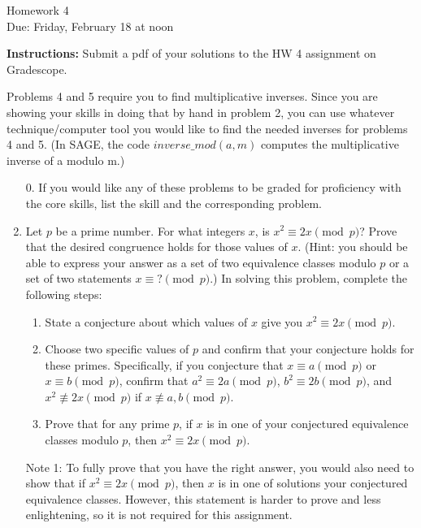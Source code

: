 \documentclass[12pt]{article}
\begin{document}
\begin{center}
{\Large Homework 4}\\
Due: Friday,  February 18 at noon\\


\end{center}
{\bf Instructions:} Submit a pdf of your solutions to the HW 4 assignment on Gradescope. 


 Problems 4 and 5 require you to find multiplicative inverses. Since you are showing your skills in doing that by hand in problem 2, you can use whatever technique/computer tool you would like to find the needed inverses for problems 4 and 5.  (In SAGE, the code $inverse\_mod(a,m)$ computes the multiplicative inverse of a modulo m.)

\begin{enumerate}
\item[0.] If you would like any of these problems to be graded for proficiency with the core skills, list the skill and the corresponding problem. 
\item Let $p$ be a prime number.  For what integers $x$, is $x^2\equiv 2x\pmod{p}$? Prove that the desired congruence holds for those values of $x$.  (Hint: you should be able to express your answer as a set of two equivalence classes modulo $p$ or a set of two statements $x\equiv ?\pmod{p}$.) In solving this problem, complete the following steps:
\begin{enumerate}
\item State a conjecture about which values of $x$ give you $x^2\equiv 2x\pmod{p}$.
\item Choose two specific values of $p$ and confirm that your conjecture holds for these primes.  Specifically, if you conjecture that $x\equiv a\pmod{p}$ or $x\equiv b\pmod{p}$, confirm that $a^2\equiv 2a\pmod{p}$, $b^2\equiv2b\pmod{p}$, and $x^2\not\equiv 2x\pmod{p}$ if $x\not\equiv a,b\pmod{p}$. 
\item Prove that for any prime $p$, if $x$ is in one of your conjectured equivalence classes modulo $p$, then $x^2\equiv 2x\pmod{p}$. 
\end{enumerate}

Note 1: To fully prove that you have the right answer, you would also need to show that if $x^2\equiv 2x\pmod{p}$, then $x$ is in one of  solutions your conjectured equivalence classes. However, this statement is harder to prove and less enlightening, so it is not required for this assignment.


\end{enumerate}
\end{document}
